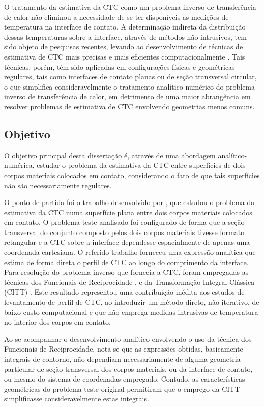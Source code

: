 O tratamento da estimativa da CTC como um problema inverso de transferência de calor não eliminou a necessidade de se ter disponíveis as medições de
temperatura na interface de contato. A determinação indireta da distribuição dessas temperaturas sobre a interface, através de métodos não intrusivos,
tem sido objeto de pesquisas recentes, levando ao desenvolvimento de técnicas de estimativa de CTC mais precisas e mais eficientes computacionalmente
\citep{artigo_colaco_1, artigo_colaco_2, artigo_colaco_3, artigo_colaco_4, artigo_padilha_3}. Tais técnicas, porém, têm sido aplicadas em configurações
físicas e geométricas regulares, tais como interfaces de contato planas ou de seção transversal circular, o que simplifica consideravelmente o tratamento
analítico-numérico do problema inverso de transferência de calor, em detrimento de uma maior abrangência em resolver problemas de estimativa de CTC
envolvendo geometrias menos comuns.

\subsection{Objetivo}

O objetivo principal desta dissertação é, através de uma abordagem analítico-numérica, estudar o problema da estimativa da CTC entre superfícies
de dois corpos materiais colocados em contato, considerando o fato de que tais superfícies não são necessariamente regulares.  

O ponto de partida foi o trabalho desenvolvido por \cite{tese_padilha}, que estudou o problema da estimativa da CTC numa superfície
plana entre dois corpos materiais colocados em contato. O problema-teste analisado foi configurado de forma que a seção transversal do
conjunto composto pelos dois
corpos materiais tivesse formato retangular e a CTC sobre a interface dependesse
espacialmente de apenas uma coordenada cartesiana. O referido trabalho forneceu uma expressão analítica que estima de forma direta
o perfil de CTC ao longo do comprimento da interface. Para resolução do problema inverso que fornecia a CTC, foram empregadas as técnicas dos Funcionais de Reciprocidade \citep{artigo_andrieux},
e da Transformação Integral Clássica (CITT) \citep{livro_cotta}. Este resultado representou uma contribuição inédita aos estudos de levantamento de perfil de CTC,
ao introduzir um método direto, não iterativo, de baixo custo computacional e que não emprega medidas intrusivas de temperatura no interior dos corpos em contato.

Ao se acompanhar o desenvolvimento analítico envolvendo o uso da técnica dos Funcionais de Reciprocidade, nota-se que as expressões obtidas, basicamente integrais de contorno, não dependiam necessariamente de
alguma geometria particular de seção transversal dos corpos materiais, ou da interface de contato, ou mesmo do sistema de coordenadas empregado.
Contudo, as características geométricas do problema-teste original permitiram que o emprego da CITT simplificasse consideravelmente estas integrais.

